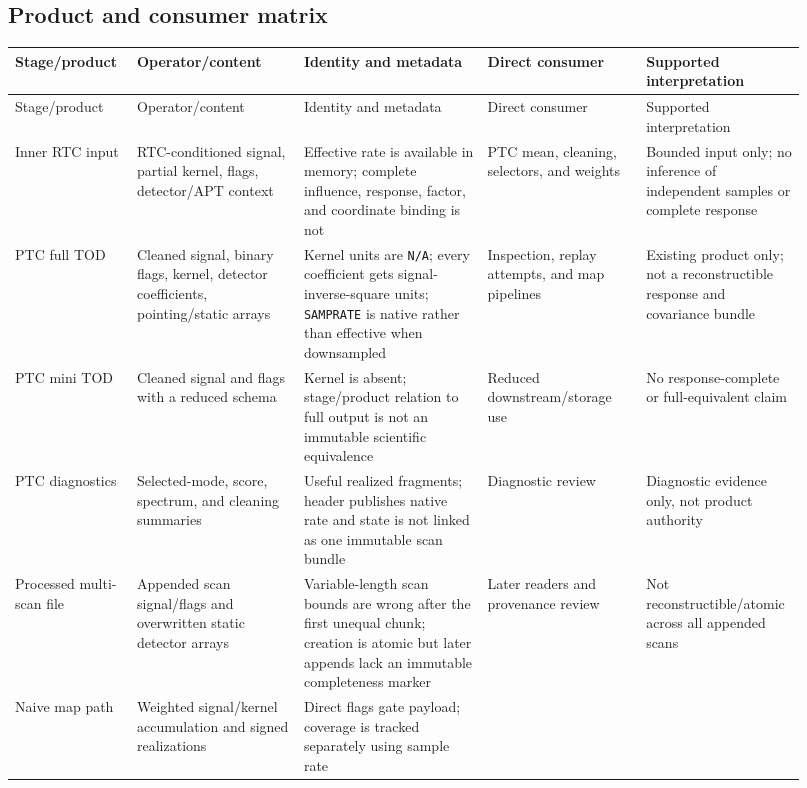 \documentclass[11pt]{article}
\newcommand{\code}[1]{\nolinkurl{#1}}
\begin{document}
\subsection{Product and consumer matrix}

\begin{longtable}{L{0.145\linewidth}L{0.20\linewidth}L{0.22\linewidth}L{0.19\linewidth}L{0.17\linewidth}}
\toprule
Stage/product & Operator/content & Identity and metadata & Direct consumer & Supported interpretation\\
\midrule
\endfirsthead
\toprule
Stage/product & Operator/content & Identity and metadata & Direct consumer & Supported interpretation\\
\midrule
\endhead
Inner RTC input &
RTC-conditioned signal, partial kernel, flags, detector/APT context &
Effective rate is available in memory; complete influence, response, factor,
and coordinate binding is not &
PTC mean, cleaning, selectors, and weights &
Bounded input only; no inference of independent samples or complete response\\
PTC full TOD &
Cleaned signal, binary flags, kernel, detector coefficients, pointing/static
arrays &
Kernel units are \code{N/A}; every coefficient gets signal-inverse-square
units; \code{SAMPRATE} is native rather than effective when downsampled &
Inspection, replay attempts, and map pipelines &
Existing product only; not a reconstructible response and covariance bundle\\
PTC mini TOD &
Cleaned signal and flags with a reduced schema &
Kernel is absent; stage/product relation to full output is not an immutable
scientific equivalence &
Reduced downstream/storage use &
No response-complete or full-equivalent claim\\
PTC diagnostics &
Selected-mode, score, spectrum, and cleaning summaries &
Useful realized fragments; header publishes native rate and state is not
linked as one immutable scan bundle &
Diagnostic review &
Diagnostic evidence only, not product authority\\
Processed multi-scan file &
Appended scan signal/flags and overwritten static detector arrays &
Variable-length scan bounds are wrong after the first unequal chunk; creation
is atomic but later appends lack an immutable completeness marker &
Later readers and provenance review &
Not reconstructible/atomic across all appended scans\\
Naive map path &
Weighted signal/kernel accumulation and signed realizations &
Direct flags gate payload; coverage is tracked separately using sample rate &

\end{longtable}
\end{document}
